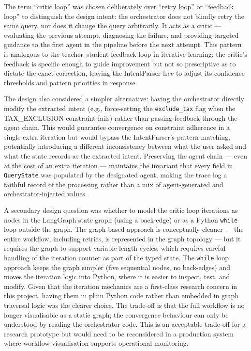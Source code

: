 \documentclass[12pt,a4paper]{report}
\begin{document}
The term ``critic loop'' was chosen deliberately over ``retry loop'' or ``feedback loop'' to distinguish the design intent: the orchestrator does not blindly retry the same query, nor does it change the query arbitrarily. It acts as a critic — evaluating the previous attempt, diagnosing the failure, and providing targeted guidance to the first agent in the pipeline before the next attempt. This pattern is analogous to the teacher--student feedback loop in iterative learning: the critic's feedback is specific enough to guide improvement but not so prescriptive as to dictate the exact correction, leaving the IntentParser free to adjust its confidence thresholds and pattern priorities in response.

The design also considered a simpler alternative: having the orchestrator directly modify the extracted intent (e.g., force-setting the \texttt{exclude\_tax} flag when the TAX\_EXCLUSION constraint fails) rather than passing feedback through the agent chain. This would guarantee convergence on constraint adherence in a single extra iteration but would bypass the IntentParser's pattern matching, potentially introducing a different inconsistency between what the user asked and what the state records as the extracted intent. Preserving the agent chain — even at the cost of an extra iteration — maintains the invariant that every field in \texttt{QueryState} was populated by the designated agent, making the trace log a faithful record of the processing rather than a mix of agent-generated and orchestrator-injected values.

A secondary design question was whether to model the critic loop iterations as nodes in the LangGraph state graph (using a back-edge) or as a Python \texttt{while} loop outside the graph. The graph-based approach is conceptually cleaner — the entire workflow, including retries, is represented in the graph topology — but it requires the graph to support variable-length cycles, which requires careful handling of the iteration counter as part of the typed state. The \texttt{while} loop approach keeps the graph simpler (five sequential nodes, no back-edges) and moves the iteration logic into Python, where it is easier to inspect, test, and modify. Given that the iteration mechanics are a first-class research concern in this project, having them in plain Python code rather than embedded in graph traversal logic was the clearer choice. The trade-off is that the full workflow is no longer visualisable as a static graph; the convergence behaviour can only be understood by reading the orchestrator code. This is an acceptable trade-off for a research prototype but would need to be reconsidered in a production system where workflow visualisation supports operational monitoring.
\end{document}
